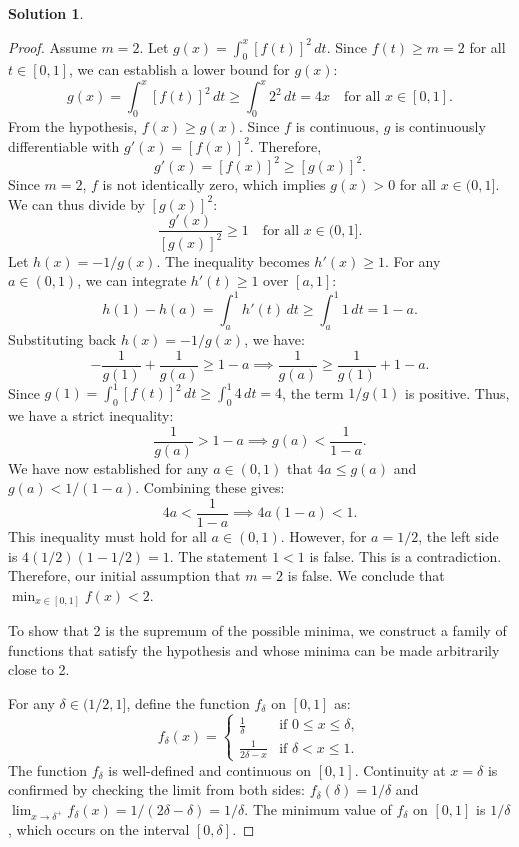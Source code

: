 \documentclass[12pt]{article}
\theoremstyle{definition}
\newtheorem*{solution}{\normalfont\textbf{Solution}}
\begin{document}
\begin{enumerate}[leftmargin=*]
\begin{solution}
\begin{proof}
            Assume $m = 2$. Let $g(x) = \int_0^x [f(t)]^2 \,dt$.
            Since $f(t) \geq m = 2$ for all $t \in [0,1]$, we can establish a lower bound for $g(x)$:
            \[
            g(x) = \int_0^x [f(t)]^2 \,dt \geq \int_0^x 2^2 \,dt = 4x \quad \text{for all } x \in [0,1].
            \]
            From the hypothesis, $f(x) \geq g(x)$. Since $f$ is continuous, $g$ is continuously differentiable with $g'(x) = [f(x)]^2$. Therefore,
            \[
            g'(x) = [f(x)]^2 \geq [g(x)]^2.
            \]
            Since $m=2$, $f$ is not identically zero, which implies $g(x) > 0$ for all $x \in (0,1]$. We can thus divide by $[g(x)]^2$:
            \[
            \frac{g'(x)}{[g(x)]^2} \geq 1 \quad \text{for all } x \in (0,1].
            \]
            Let $h(x) = -1/g(x)$. The inequality becomes $h'(x) \geq 1$.
            For any $a \in (0,1)$, we can integrate $h'(t) \geq 1$ over $[a, 1]$:
            \[
            h(1) - h(a) = \int_a^1 h'(t) \,dt \geq \int_a^1 1 \,dt = 1-a.
            \]
            Substituting back $h(x) = -1/g(x)$, we have:
            \[
            -\frac{1}{g(1)} + \frac{1}{g(a)} \geq 1-a \implies \frac{1}{g(a)} \geq \frac{1}{g(1)} + 1-a.
            \]
            Since $g(1) = \int_0^1 [f(t)]^2 \,dt \geq \int_0^1 4 \,dt = 4$, the term $1/g(1)$ is positive. Thus, we have a strict inequality:
            \[
            \frac{1}{g(a)} > 1-a \implies g(a) < \frac{1}{1-a}.
            \]
            We have now established for any $a \in (0,1)$ that $4a \leq g(a)$ and $g(a) < 1/(1-a)$. Combining these gives:
            \[
            4a < \frac{1}{1-a} \implies 4a(1-a) < 1.
            \]
            This inequality must hold for all $a \in (0,1)$. However, for $a=1/2$, the left side is $4(1/2)(1-1/2) = 1$. The statement $1 < 1$ is false. This is a contradiction.
            Therefore, our initial assumption that $m=2$ is false. We conclude that $\min_{x \in [0, 1]} f(x) < 2$.

            To show that 2 is the supremum of the possible minima, we construct a family of functions that satisfy the hypothesis and whose minima can be made arbitrarily close to 2.

            For any $\delta \in (1/2, 1]$, define the function $f_\delta$ on $[0,1]$ as:
            \[
            f_\delta(x) = 
            \begin{cases}
            \frac{1}{\delta} & \text{if } 0 \leq x \leq \delta, \\
            \frac{1}{2\delta - x} & \text{if } \delta < x \leq 1.
            \end{cases}
            \]
            The function $f_\delta$ is well-defined and continuous on $[0,1]$. Continuity at $x=\delta$ is confirmed by checking the limit from both sides: $f_\delta(\delta) = 1/\delta$ and $\lim_{x\to\delta^+} f_\delta(x) = 1/(2\delta-\delta) = 1/\delta$.
            The minimum value of $f_\delta$ on $[0,1]$ is $1/\delta$, which occurs on the interval $[0, \delta]$.


\end{proof}
\end{solution}
\end{enumerate}
\end{document}
